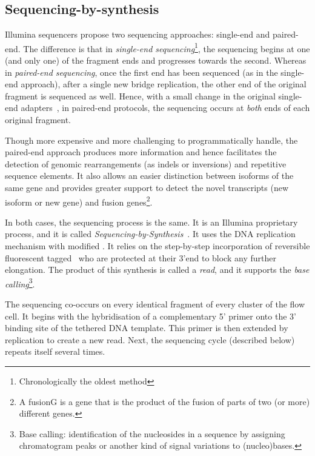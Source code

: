 \subsection{Sequencing-by-synthesis}%
\label{subsub:sequencing}

Illumina sequencers propose two sequencing approaches: single-end and paired-end.
The difference is that in \emph{single-end sequencing}\footnote{Chronologically
the oldest method}, the sequencing begins at one (and only one) of the fragment
ends and progresses towards the second. Whereas in \emph{paired-end sequencing},
once the first end has been sequenced (as in the single-end approach), after a
single new bridge replication, the other end of the original fragment is
sequenced as well.
Hence, with a small change in the original single-end adapters~,
in paired-end protocols, the sequencing occurs at \emph{both}
ends of each original fragment.

Though more expensive and more challenging to programmatically handle,
the paired-end approach produces more information and hence facilitates
the detection of genomic rearrangements (as indels or inversions) and
repetitive sequence elements.
It also allows an easier distinction between isoforms of the same gene and provides
greater support to detect the novel transcripts (new isoform or new gene) and fusion
genes\footnote{A \gls{fusionG} is a gene that is the product of the fusion of
parts of two (or more) different genes.}.

In both cases, the sequencing process is the same. It is an Illumina proprietary
process, and it is called \emph{Sequencing-by-Synthesis}~.
It uses the \gls{DNA} replication mechanism with modified \dNTPs.
It relies on the step-by-step incorporation of
reversible fluorescent tagged \dNTPs\ who are protected at
their 3'end to block any further elongation.
The product of this synthesis is called a \emph{read}, and
it supports the \emph{base calling}\footnote{Base calling:
identification of the nucleosides in a sequence
by assigning chromatogram peaks
or another kind of signal variations
to (nucleo){}bases.}.


The sequencing co-occurs on every identical fragment
of every cluster of the flow cell.
It begins with the hybridisation of a complementary 5' primer onto the 3' binding
site of the tethered \gls{DNA} template. This primer is then extended by
replication to create a new read. Next, the sequencing cycle (described below)
repeats itself several times.

